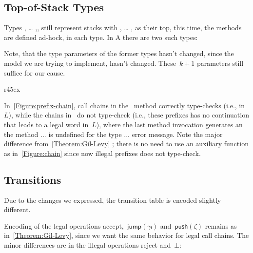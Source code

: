\subsection{Top-of-Stack Types}
Types , … ,, still represent stacks
  with , … , as their top,
  this time, the methods are defined ad-hock, in each type.
In A there are two such types:

\begin{quote}
\end{quote}

Note, that the type parameters of the former types hasn't changed,
  since the model we are trying to implement, hasn't changed.
  These~$k+1$ parameters still suffice for our cause.

\begin{wrapfigure}[14]r{45ex}
  \caption{\label{Figure:prefix-chain} Accepting and non-accepting call chains with the
  type encoding of jDPDA~$A$ (as defined in \cref{Table:A}), such that
  illegal prefixes won't compile}
\end{wrapfigure}

In~\cref{Figure:prefix-chain}, call chains in the~ method
  correctly type-checks (i.e., in~$L$), while the chains in~
  do not type-check (i.e., these prefixes has no continuation that leads to a legal word in~$L$),
  where the last method invocation generates an \textsf{the method ... is undefined for the type ...}
  error message.
Note the major difference from~\cref{Theorem:Gil-Levy} ; there is no need to
  use an auxiliary function  as in~\cref{Figure:chain} since now illegal
  prefixes does not type-check.

\subsection{Transitions}
Due to the changes we expressed, the transition table is encoded slightly different.

Encoding of the legal operations \textsf{accept},~$\textsf{jump}(γᵢ)$ and~$\textsf{push}(ζ)$
  remains as in~\cref{Theorem:Gil-Levy}, since we want the same behavior for legal call chains.
The minor differences are in the illegal operations \textsf{reject} and~$⊥$:

